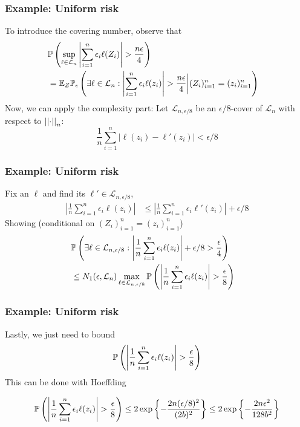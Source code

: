 \documentclass[12pt]{beamer}
\begin{document}
\begin{frame}[fragile]
\frametitle{Example: Uniform risk }
 To introduce the covering number, observe that
\begin{align*}
\lefteqn{\P\left(\sup_{\ell \in \mathcal{L}_n} \left| \sum_{i=1}^n \epsilon_i \ell(Z_i)\right| > \frac{n\epsilon}{4}\right)} \\
& =
\E_Z\P_\epsilon\left(\exists \ell \in \mathcal{L}_n : \left| \sum_{i=1}^n \epsilon_i \ell(z_i)\right| > \frac{n\epsilon}{4} \bigg| (Z_i)_{i=1}^n = (z_i)_{i=1}^n\right)
\end{align*}
Now, we can apply the complexity part: Let $\mathcal{L}_{n,\epsilon/8}$  be an $\epsilon/8$-cover of $\mathcal{L}_n$
with respect to $\norm{\cdot}_{n}$:
\[
\frac{1}{n}\sum_{i=1}^n |\ell(z_i) - \ell'(z_i)| < \epsilon/8
\]
\end{frame}

\begin{frame}[fragile]
\frametitle{Example: Uniform risk }
 Fix an $\ell$ and find its $\ell' \in \mathcal{L}_{n,\epsilon/8}$,
\begin{align*}
\left| \frac{1}{n}\sum_{i=1}^n \epsilon_i \ell(z_i)\right| 
& \leq
\left| \frac{1}{n}\sum_{i=1}^n \epsilon_i \ell'(z_i)\right| + \epsilon/8
\end{align*}
Showing (conditional on $(Z_i)_{i=1}^n = (z_i)_{i=1}^n$)
\begin{align*}
\lefteqn{\P\left(\exists \ell \in \mathcal{L}_{n,\epsilon/8} : \left| \frac{1}{n}\sum_{i=1}^n \epsilon_i \ell(z_i)\right| + \epsilon/8 > \frac{\epsilon}{4} \right)} \\
& \leq 
N_1(\epsilon,\mathcal{L}_n) \max_{\ell \in \mathcal{L}_{n,\epsilon/8}}
\P\left( \left| \frac{1}{n}\sum_{i=1}^n \epsilon_i \ell(z_i)\right| >\frac{\epsilon}{8}\right)
\end{align*}
\end{frame}

\begin{frame}[fragile]
\frametitle{Example: Uniform risk }
 Lastly, we just need to bound 
\[
\P\left( \left| \frac{1}{n}\sum_{i=1}^n \epsilon_i \ell(z_i)\right| >\frac{\epsilon}{8}\right)
\]
This can be done with Hoeffding

\[
\P\left( \left| \frac{1}{n}\sum_{i=1}^n \epsilon_i \ell(z_i)\right| >\frac{\epsilon}{8}\right)
\leq
2\exp\left\{- \frac{2n(\epsilon/8)^2}{(2b)^2} \right\}
\leq
2\exp\left\{- \frac{2n\epsilon^2}{128b^2} \right\}
\]
\end{frame}
\end{document}
